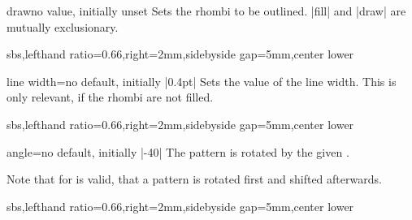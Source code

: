 \documentclass[a4paper,11pt]{article}
\begin{document}
\begin{docPatternKey}{draw}{}{no value, initially unset}
  Sets the rhombi to be outlined. |fill| and |draw| are mutually exclusionary.
\begin{dispExample*}{sbs,lefthand ratio=0.66,right=2mm,sidebyside gap=5mm,center lower}
\end{dispExample*}
\end{docPatternKey}


\begin{docPatternKey}{line width}{=}{no default, initially |0.4pt|}
  Sets the  value of the line width. This is only relevant, if
  the rhombi are not filled.

\begin{dispExample*}{sbs,lefthand ratio=0.66,right=2mm,sidebyside gap=5mm,center lower}
\end{dispExample*}
\end{docPatternKey}


\begin{docPatternKey}{angle}{=}{no default, initially |-40|}
  The pattern is rotated by the given .
  \par
  Note that for  is valid, that a pattern is rotated first and shifted afterwards.
\begin{dispExample*}{sbs,lefthand ratio=0.66,right=2mm,sidebyside gap=5mm,center lower}
\end{dispExample*}
\end{docPatternKey}

\clearpage
\end{document}
